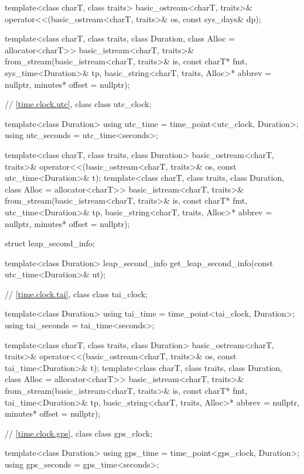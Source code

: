 \begin{codeblock}
{  template<class charT, class traits>
    basic_ostream<charT, traits>&
      operator<<(basic_ostream<charT, traits>& os, const sys_days& dp);

  template<class charT, class traits, class Duration, class Alloc = allocator<charT>>
    basic_istream<charT, traits>&
      from_stream(basic_istream<charT, traits>& is, const charT* fmt,
                  sys_time<Duration>& tp,
                  basic_string<charT, traits, Alloc>* abbrev = nullptr,
                  minutes* offset = nullptr);

  // \ref{time.clock.utc}, class 
  class utc_clock;

  template<class Duration>
    using utc_time  = time_point<utc_clock, Duration>;
  using utc_seconds = utc_time<seconds>;

  template<class charT, class traits, class Duration>
    basic_ostream<charT, traits>&
      operator<<(basic_ostream<charT, traits>& os, const utc_time<Duration>& t);
  template<class charT, class traits, class Duration, class Alloc = allocator<charT>>
    basic_istream<charT, traits>&
      from_stream(basic_istream<charT, traits>& is, const charT* fmt,
                  utc_time<Duration>& tp,
                  basic_string<charT, traits, Alloc>* abbrev = nullptr,
                  minutes* offset = nullptr);

  struct leap_second_info;

  template<class Duration>
    leap_second_info get_leap_second_info(const utc_time<Duration>& ut);

  // \ref{time.clock.tai}, class 
  class tai_clock;

  template<class Duration>
    using tai_time  = time_point<tai_clock, Duration>;
  using tai_seconds = tai_time<seconds>;

  template<class charT, class traits, class Duration>
    basic_ostream<charT, traits>&
      operator<<(basic_ostream<charT, traits>& os, const tai_time<Duration>& t);
  template<class charT, class traits, class Duration, class Alloc = allocator<charT>>
    basic_istream<charT, traits>&
      from_stream(basic_istream<charT, traits>& is, const charT* fmt,
                  tai_time<Duration>& tp,
                  basic_string<charT, traits, Alloc>* abbrev = nullptr,
                  minutes* offset = nullptr);

  // \ref{time.clock.gps}, class 
  class gps_clock;

  template<class Duration>
    using gps_time  = time_point<gps_clock, Duration>;
  using gps_seconds = gps_time<seconds>;

}
\end{codeblock}
